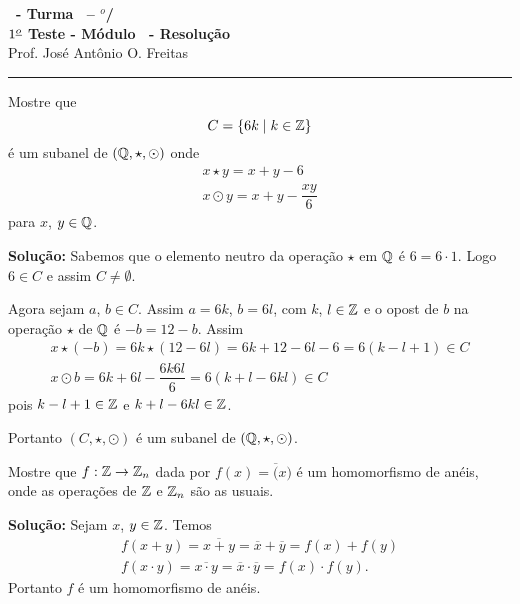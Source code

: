 \documentclass[12pt]{exam}
\begin{document}
\begin{center}
{\Large\bf \disciplina\ - Turma \turma\ -- \semestre$^{o}$/\ano} \\ \vspace{9pt} {\large\bf
$1^{\underline{o}}$ Teste - M\'odulo \modulo\ - Resolu\c{c}\~ao}\\
\vspace{9pt} Prof. Jos{\'e} Ant{\^o}nio O. Freitas
\end{center}
\hrule

\vspace{.6cm}

\questao{} Mostre que
\[
	C = \{6k \mid k \in \mathbb{Z}\}
\]
é um subanel de $(\mathbb{Q}, \star, \odot)$ onde
\begin{align*}
	x \star y = x + y - 6\\
	x \odot y = x + y - \dfrac{xy}{6}
\end{align*}
para $x$, $y \in \mathbb{Q}$.

\noindent\textbf{Solu\c{c}\~ao:} Sabemos que o elemento neutro da operação $\star$ em $\mathbb{Q}$ é $6 = 6\cdot 1$. Logo $6 \in C$ e assim $C \neq \emptyset$.

Agora sejam $a$, $b \in C$. Assim $a = 6k$, $b = 6l$, com $k$, $l \in \mathbb{Z}$ e o opost de $b$ na operação $\star$ de $\mathbb{Q}$ é $-b = 12 - b$. Assim
\begin{align*}
	x \star (-b) = 6k \star (12 - 6l) = 6k + 12 - 6l - 6 = 6(k - l + 1) \in C\\
	x \odot b = 6k + 6l - \dfrac{6k6l}{6} = 6(k + l - 6kl) \in C
\end{align*}
pois $k - l + 1 \in \mathbb{Z}$ e $k + l - 6kl \in \mathbb{Z}$.

Portanto $(C, \star, \odot)$ é um subanel de $(\mathbb{Q}, \star, \odot)$.


\questao{} Mostre que $f : \mathbb{Z} \to \mathbb{Z}_n$ dada por $f(x) = \overline(x)$ é um homomorfismo de anéis, onde as operações de $\mathbb{Z}$ e $\mathbb{Z}_n$ são as usuais.

\noindent\textbf{Solu\c{c}\~ao:} Sejam $x$, $y \in \mathbb{Z}$. Temos
\begin{align*}
	f(x + y) = \overline{x + y} = \overline{x} + \overline{y} = f(x) + f(y)\\
	f(x\cdot y) = \overline{x\cdot y} = \overline{x}\cdot\overline{y} = f(x)\cdot f(y).
\end{align*}
Portanto $f$ é um homomorfismo de anéis.
\end{document}
